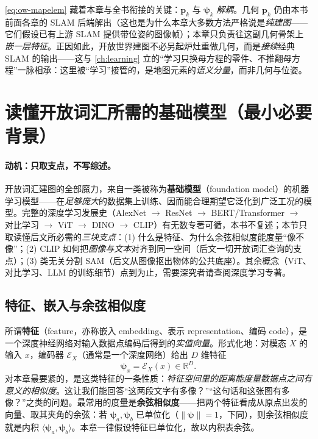 \begin{insight}
\cref{eq:ow-mapelem} 藏着本章与全书衔接的关键：$\mathbf{p}_k$ 与 $\boldsymbol\psi_k$ \emph{解耦}。几何 $\mathbf{p}_k$ 仍由本书前面各章的 SLAM 后端解出（这也是为什么本章大多数方法严格说是\emph{纯建图}——它们假设已有上游 SLAM 提供带位姿的图像帧）；本章只负责往这副几何骨架上\emph{嵌一层特征}。正因如此，开放世界建图不必另起炉灶重做几何，而是\emph{接续}经典 SLAM 的输出——这与 \cref{ch:learning} 立的“学习只换母方程的零件、不推翻母方程”一脉相承：这里被“学习”接管的，是地图元素的\emph{语义分量}，而非几何与位姿。
\end{insight}

\section{读懂开放词汇所需的基础模型（最小必要背景）}
\label{sec:openworld-fm}

\paragraph{动机：只取支点，不写综述。}
开放词汇建图的全部魔力，来自一类被称为\textbf{基础模型}（foundation model）的机器学习模型——在\emph{足够庞大}的数据集上训练、因而能合理期望它泛化到广泛工况的模型\cite{paull2026openworld}。完整的深度学习发展史（AlexNet $\to$ ResNet $\to$ BERT/Transformer $\to$ 对比学习 $\to$ ViT $\to$ DINO $\to$ CLIP）有无数专著可循，本书不复述；本节只取读懂后文所必需的\emph{三块支点}：(1) 什么是特征、为什么余弦相似度能度量“像不像”；(2) CLIP 如何把\emph{图像与文本}对齐到同一空间（后文一切开放词汇查询的支点）；(3) 类无关分割 SAM（后文从图像抠出物体的公共底座）。其余概念（ViT、对比学习、LLM 的训练细节）点到为止，需要深究者请查阅深度学习专著\cite{goodfellow2016deeplearning}。

\subsection{特征、嵌入与余弦相似度}
\label{sec:openworld-feature}

所谓\textbf{特征}（feature，亦称嵌入 embedding、表示 representation、编码 code），是一个深度神经网络对输入数据点编码后得到的\emph{实值向量}\cite{paull2026openworld}。形式化地：对模态 $X$ 的输入 $x$，编码器 $\mathcal{E}_X$（通常是一个深度网络）给出 $D$ 维特征
\begin{equation}
  \boldsymbol\psi_x=\mathcal{E}_X(x)\in\mathbb{R}^{D}.
  \label{eq:ow-encoder}
\end{equation}
对本章最要紧的，是这类特征的一条性质：\emph{特征空间里的距离能度量数据点之间有意义的相似度}。这让我们能回答“这两段文字有多像？”“这句话和这张图有多像？”之类的问题。最常用的度量是\textbf{余弦相似度}——把两个特征看成从原点出发的向量、取其夹角的余弦：若 $\boldsymbol\psi_a,\boldsymbol\psi_b$ 已单位化（$\|\boldsymbol\psi\|=1$，下同），则余弦相似度就是内积 $\langle\boldsymbol\psi_a,\boldsymbol\psi_b\rangle$。本章一律假设特征已单位化，故以内积表余弦。

